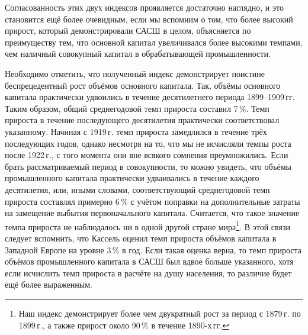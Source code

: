 \documentclass[leqno]{article}  %
\begin{document}
\par
Согласованность этих двух индексов проявляется достаточно наглядно, и это становится ещё более очевидным, если мы вспомним о том, что более высокий прирост, который демонстрировали САСШ в целом, объясняется по преимуществу тем, что основной капитал увеличивался более высокими темпами, чем наличный совокупный капитал в обрабатывающей промышленности.
\par
Необходимо отметить, что полученный индекс демонстрирует поистине беспрецедентный рост объёмов основного капитала. Так, объёмы основного капитала практически удвоились в течение десятилетнего периода 1899--1909\,гг. Таким образом, общий среднегодовой темп прироста составил 7\,\%. Темп прироста в течение последующего десятилетия практически соответствовал указанному. Начиная с 1919\,г. темп прироста замедлился в течение трёх последующих годов, однако несмотря на то, что мы не исчисляли темпы роста после 1922\,г., с того момента они вне всякого сомнения преумножились. Если брать рассматриваемый период в совокупности, то можно увидеть, что объёмы промышленного капитала практически удваивались в течение каждого десятилетия, или, иными словами, соответствующий среднегодовой темп прироста составлял примерно 6\,\% с учётом поправки на дополнительные затраты на замещение выбытия первоначального капитала. Считается, что такое значение темпа прироста не наблюдалось ни в одной другой стране мира\footnote{Наш индекс демонстрирует более чем двукратный рост за период с 1879\,г. по 1899\,г., а также прирост около 90\,\% в течение 1890-х\,гг.}. В этой связи следует вспомнить, что Кассель оценил темп прироста объёмов капитала в Западной Европе на уровне 3\,\% в год. Если такая оценка верна, то темп прироста объёмов промышленного капитала в САСШ был вдвое больше указанного, хотя если исчислить темп прироста в расчёте на душу населения, то различие будет ещё более выраженным.
\end{document}

